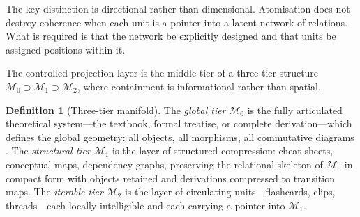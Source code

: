 \documentclass{amsart}
\theoremstyle{plain}
\theoremstyle{definition}
\newtheorem{definition}[theorem]{Definition}
\theoremstyle{remark}
\newcommand{\Man}{\mathcal{M}}
\begin{document}
The key distinction is directional rather than dimensional.  Atomisation does not
destroy coherence when each unit is a pointer into a latent network of relations.
What is required is that the network be explicitly designed and that units be
assigned positions within it.

The controlled projection layer is the middle tier of a three-tier structure
$\Man_0 \supset \Man_1 \supset \Man_2$, where containment is informational rather
than spatial.

\begin{definition}[Three-tier manifold]
  \label{def:three-tier}
  The \emph{global tier} $\Man_0$ is the fully articulated theoretical system---the
  textbook, formal treatise, or complete derivation---which defines the global
  geometry: all objects, all morphisms, all commutative diagrams \cite{maclane1998}.
  The \emph{structural tier} $\Man_1$ is the layer of structured compression: cheat
  sheets, conceptual maps, dependency graphs, preserving the relational skeleton of
  $\Man_0$ in compact form with objects retained and derivations compressed to
  transition maps.  The \emph{iterable tier} $\Man_2$ is the layer of circulating
  units---flashcards, clips, threads---each locally intelligible and each carrying
  a pointer into $\Man_1$.
\end{definition}
\end{document}
